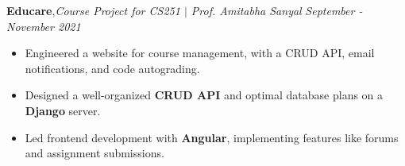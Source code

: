 \textbf{Educare}\sep{\it Course Project for CS251 $|$ Prof. Amitabha Sanyal} \hfill{\sl \small September - November 2021}\\
\vspace{-8pt}
\begin{itemize}[itemsep = -1.3 mm, leftmargin=*]
\item Engineered a website for course management, with a CRUD API, email notifications, and code autograding.
\item Designed a well-organized {\bf CRUD API} and optimal database plans on a {\bf Django} server.
\item Led frontend development with \textbf{Angular}, implementing features like forums and assignment submissions.
\end{itemize}
